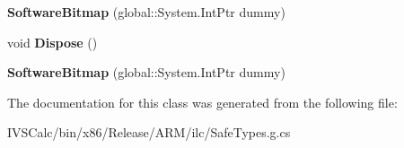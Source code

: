 \begin{DoxyCompactItemize}
{\bfseries Software\+Bitmap} (global\+::\+System.\+Int\+Ptr dummy)
\item 
\mbox{\label{class_windows_1_1_graphics_1_1_imaging_1_1_software_bitmap_ab5ef468e8775f74723e8091521a76ae6}} 
void {\bfseries Dispose} ()
\item 
\mbox{\label{class_windows_1_1_graphics_1_1_imaging_1_1_software_bitmap_a55e54367e0c1acaa3b81d1223b096476}} 
{\bfseries Software\+Bitmap} (global\+::\+System.\+Int\+Ptr dummy)
\end{DoxyCompactItemize}


The documentation for this class was generated from the following file\+:\begin{DoxyCompactItemize}
\item 
I\+V\+S\+Calc/bin/x86/\+Release/\+A\+R\+M/ilc/Safe\+Types.\+g.\+cs\end{DoxyCompactItemize}
